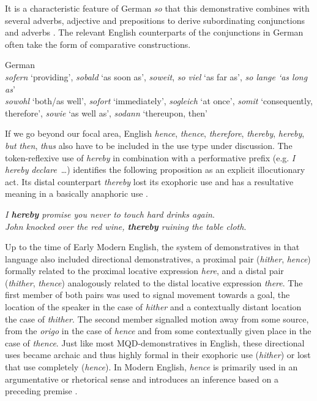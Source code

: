\documentclass[output=paper,colorlinks,citecolor=brown]{langscibook}
\begin{document}
It is a characteristic feature of German \textit{so} that this demonstrative combines with several adverbs, adjective and prepositions to derive subordinating conjunctions  and adverbs . The relevant English counterparts of the conjunctions in German often take the form of comparative constructions.

\ea\label{ex:koenig:18} {German}\\
\ea\label{ex:koenig:18a}
 \textit{sofern} ‘providing’, \textit{sobald} ‘as soon as’, \textit{soweit}, \textit{so viel} ‘as far as’, \textit{so lange ‘as long as}’\\
\ex\label{ex:koenig:18b} \textit{sowohl} ‘both/as well’, \textit{sofort} ‘immediately’, \textit{sogleich} ‘at once’, \textit{somit} ‘consequently, therefore’, \textit{sowie} ‘as well as’,  \textit{sodann} ‘thereupon, then’\\
\z
\z

If we go beyond our focal area, English \textit{hence}, \textit{thence}, \textit{therefore}, \textit{thereby}, \textit{hereby}, \textit{but} \textit{then}, \textit{thus} also have to be included in the use type under discussion. The token-reflexive use of \textit{hereby} in combination with a performative prefix (e.g. \textit{I} \textit{hereby} \textit{declare}~…) identifies the following proposition as an explicit illocutionary act. Its distal counterpart \textit{thereby} lost its exophoric use and has a resultative meaning in a basically anaphoric use .

\ea\label{ex:koenig:19}
\ea \textit{I \textbf{hereby} promise you never to touch hard drinks again}.\\
\ex \textit{John knocked over the red wine, \textbf{thereby} ruining the table cloth}. \\
\z
\z

Up to the time of Early Modern English, the system of demonstratives in that language also included directional demonstratives, a proximal pair (\textit{hither}, \textit{hence}) formally related to the proximal locative expression \textit{here}, and a distal pair (\textit{thither}, \textit{thence}) analogously related to the distal locative expression \textit{there}. The first member of both pairs was used to signal movement towards a goal, the location of the speaker in the case of \textit{hither} and a contextually distant location the case of \textit{thither}. The second member signalled motion away from some source, from the \textit{origo} in the case of \textit{hence} and from some contextually given place in the case of \textit{thence}. Just like most MQD-demonstratives in English, these directional uses became archaic and thus highly formal in their exophoric use (\textit{hither}) or lost that use completely (\textit{hence}). In Modern English, \textit{hence} is primarily used in an argumentative or rhetorical sense and introduces an inference based on a preceding premise .
\end{document}
